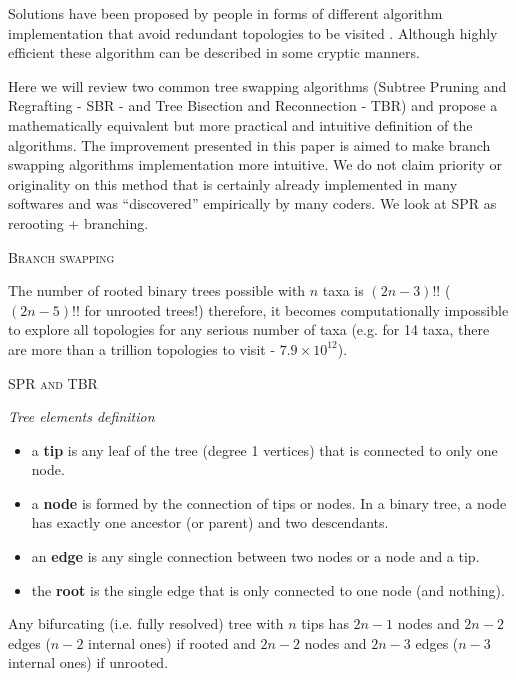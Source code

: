 \documentclass[12pt,letterpaper]{article}
\renewcommand{\section}[1]{%
\bigskip
\begin{center}
\begin{Large}
\normalfont\scshape #1
\medskip
\end{Large}
\end{center}}
\renewcommand{\subsection}[1]{%
\bigskip
\begin{center}
\begin{large}
\normalfont\itshape #1
\end{large}
\end{center}}
\begin{document}
Solutions have been proposed by people in forms of different algorithm implementation that avoid redundant topologies to be visited \citep{allen2001subtree}.
Although highly efficient these algorithm can be described in some cryptic manners.


Here we will review two common tree swapping algorithms (Subtree Pruning and Regrafting - SBR - and Tree Bisection and Reconnection - TBR) and propose a mathematically equivalent but more practical and intuitive definition of the algorithms.
The improvement presented in this paper is aimed to make branch swapping algorithms implementation more intuitive.
We do not claim priority or originality on this method that is certainly already implemented in many softwares and was ``discovered'' empirically by many coders.
We look at SPR as rerooting + branching.

\section{Branch swapping}

The number of rooted binary trees possible with $n$ taxa is $(2n-3)!!$ ($(2n-5)!!$ for unrooted trees!) therefore, it becomes computationally impossible to explore all topologies for any serious number of taxa (e.g. for 14 taxa, there are more than a trillion topologies to visit - $7.9\times10^{12}$).







\section{SPR and TBR}

\subsection{Tree elements definition}
\begin{itemize}
    \item a \textbf{tip} is any leaf of the tree (degree 1 vertices) that is connected to only one node.
    \item a \textbf{node} is formed by the connection of tips or nodes. In a binary tree, a node has exactly one ancestor (or parent) and two descendants.
    \item an \textbf{edge} is any single connection between two nodes or a node and a tip.
    \item the \textbf{root} is the single edge that is only connected to one node (and nothing).
\end{itemize}
Any bifurcating (i.e. fully resolved) tree with $n$ tips has $2n-1$ nodes and $2n-2$ edges ($n-2$ internal ones) if rooted and $2n-2$ nodes and $2n-3$ edges ($n-3$ internal ones) if unrooted.
\end{document}
